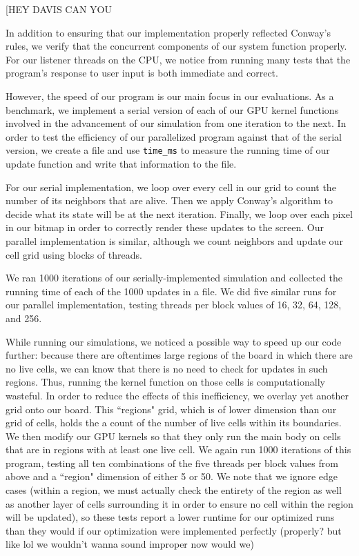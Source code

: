 \documentclass[12pt]{article}
\begin{document}
[HEY DAVIS CAN YOU 



    In addition to ensuring that our implementation properly reflected Conway's rules, we verify that the concurrent components of our system function properly. For our listener threads on the CPU, we notice from running many tests that the program's response to user input is both immediate and correct. 
    
    However, the speed of our program is our main focus in our evaluations. As a benchmark, we implement a serial version of each of our GPU kernel functions involved in the advancement of our simulation from one iteration to the next. In order to test the efficiency of our parallelized program against that of the serial version, we create a file and use \texttt{time\_ms} to measure the running time of our update function and write that information to the file. 
    
    For our serial implementation, we loop over every cell in our grid to count the number of its neighbors that are alive. Then we apply Conway's algorithm to decide what its state will be at the next iteration. Finally, we loop over each pixel in our bitmap in order to correctly render these updates to the screen. Our parallel implementation is similar, although we count neighbors and update our cell grid using blocks of threads. 

    We ran 1000 iterations of our serially-implemented simulation and collected the running time of each of the 1000 updates in a file. We did five similar runs for our parallel implementation, testing threads per block values of 16, 32, 64, 128, and 256.

    While running our simulations, we noticed a possible way to speed up our code further: because there are oftentimes large regions of the board in which there are no live cells, we can know that there is no need to check for updates in such regions. Thus, running the kernel function on those cells is computationally wasteful. In order to reduce the effects of this inefficiency, we overlay yet another grid onto our board. This ``regions" grid, which is of lower dimension than our grid of cells, holds the a count of the number of live cells within its boundaries. We then modify our GPU kernels so that they only run the main body on cells that are in regions with at least one live cell. We again run 1000 iterations of this program, testing all ten combinations of the five threads per block values from above and a ``region" dimension of either 5 or 50. We note that we ignore edge cases (within a region, we must actually check the entirety of the region as well as another layer of cells surrounding it in order to ensure no cell within the region will be updated), so these tests report a lower runtime for our optimized runs than they would if our optimization were implemented perfectly (properly? but like lol we wouldn't wanna sound improper now would we)
\end{document}
